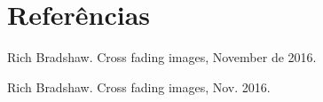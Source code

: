 \chapter{Referências}
Rich Bradshaw. Cross fading images, November de 2016.


Rich Bradshaw. Cross fading images, Nov. 2016.

